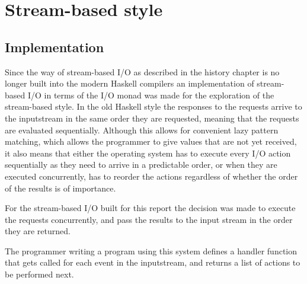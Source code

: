 


\section{Stream-based style}
\subsection{Implementation}
Since the way of stream-based I/O as described in the history chapter is no longer built into the modern Haskell compilers an implementation of stream-based I/O in terms of the I/O monad was made for the exploration of the stream-based style.
In the old Haskell style the responses to the requests arrive to the inputstream in the same order they are requested, meaning that the requests are evaluated sequentially. 
Although this allows for convenient lazy pattern matching, which allows the programmer to give values that are not yet received, it also means that either the operating system has to execute every I/O action sequentially as they need to arrive in a predictable order, or when they are executed concurrently, has to reorder the actions regardless of whether the order of the results is of importance.

For the stream-based I/O built for this report the decision was made to execute the requests concurrently, and pass the results to the input stream in the order they are returned.

The programmer writing a program using this system defines a handler function that gets called for each event in the inputstream, and returns a list of actions to be performed next.

